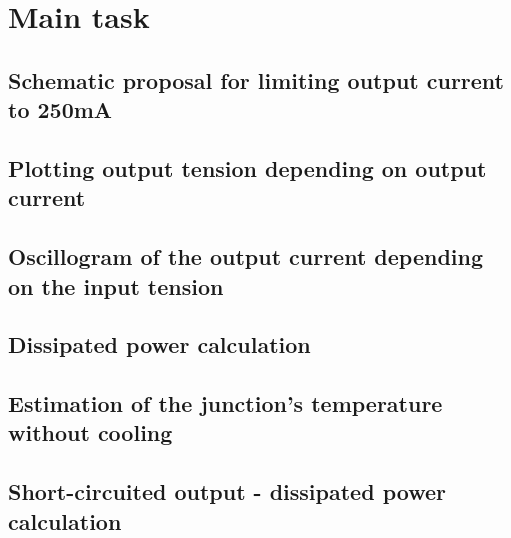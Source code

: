 \section{Main task}
\subsection{Schematic proposal for limiting output current to 250mA} \label{ssec:num11}
{}
\subsection{Plotting output tension depending on output current} \label{ssec:num12}
{}
\subsection{Oscillogram of the output current depending on the input tension} \label{ssec:num13}
{}
\subsection{Dissipated power calculation} \label{ssec:num14}
{}
\subsection{Estimation of the junction's temperature without cooling} \label{ssec:num15}
{}
\subsection{Short-circuited output - dissipated power calculation} \label{ssec:num16}
{}
\clearpage